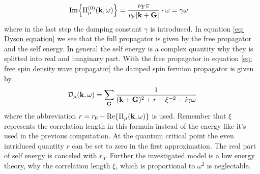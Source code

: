 %
\begin{align}
	\Im{\Pi_{\mu}^{(0)}(\vb{k}, \omega)} &= \frac{\nu_{\mt{F}} \pi}{v_{\mt{F}} |\vb{k} + \vb{G}|} \cdot \omega = \gamma \omega		 
\end{align}
%
where in the last step the damping constant $\gamma$ is introduced.
In equation \eqref{eq: Dyson equation} we see that the full propagator is given by the free propagator and the self energy.
In general the self energy is a complex quantity why they is splitted into real and imaginary part.
With the free propagator in equation \eqref{eq: free spin density wave propagator} the damped spin fermion propagator is given by
%
\begin{align}
	\mathcal{D}_{\mu}(\vb{k}, \omega) = \sum\limits_{\vb{G}} \frac{1}{(\vb{k}+\vb{G})^{2} + r - \xi^{-2} - i \gamma \omega}
	\label{eq: damped spin density propagator with real omega}
\end{align}
%
where the abbreviation $r = r_{0} - \Re{\Pi_{\mu}(\vb{k}, \omega)}$ is used.
Remember that $\xi$ represents the correlation length in this formula instead of the energy like it's used in the previous computation.
At the quantum critical point the even intriduced quantity $r$ can be set to zero in the first approximation.
The real part of self energy is canceled with $r_{0}$.
Further the investigated model is a low energy theory, why the correlation length $\xi$, which is proportional to $\omega^{2}$ is neglectable.
%
%
